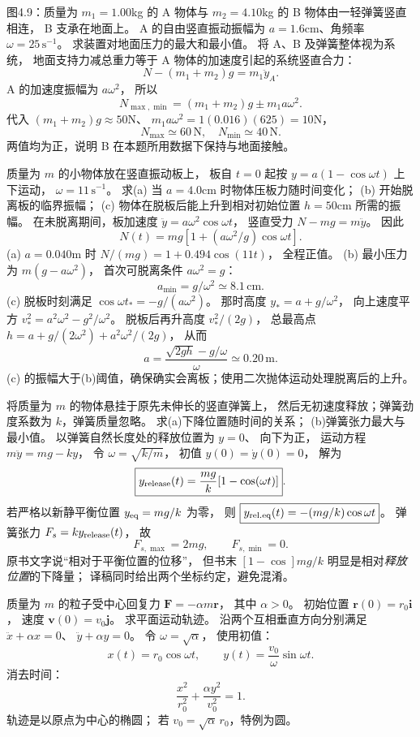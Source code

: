 图4.9：质量为 $m_1=1.00$kg 的 A 物体与
$m_2=4.10$kg 的 B 物体由一轻弹簧竖直相连，
B 支承在地面上。
A 的自由竖直振动振幅为
$a=1.6$cm、角频率
$\omega=25\,\mathrm{s^{-1}}$。
求装置对地面压力的最大和最小值。
\exsolution
将 A、B 及弹簧整体视为系统，
地面支持力减总重力等于 A 物体的加速度引起的系统竖直合力：
\[
N-(m_1+m_2)g=m_1\ddot y_A.
\]
A 的加速度振幅为 $a\omega^2$，
所以
\[
\boxed{N_{\max,\min}=
(m_1+m_2)g\pm m_1a\omega^2}.
\]
代入
$(m_1+m_2)g\approx50$N、
$m_1a\omega^2=1(0.016)(625)=10$N，
\[
\boxed{N_{\max}\simeq60\,\mathrm N,\quad
N_{\min}\simeq40\,\mathrm N}.
\]
\excheck 两值均为正，说明 B 在本题所用数据下保持与地面接触。

质量为 $m$ 的小物体放在竖直振动板上，
板自 $t=0$ 起按
$y=a(1-\cos\omega t)$ 上下运动，
$\omega=11\,\mathrm{s^{-1}}$。
求(a) 当 $a=4.0$cm 时物体压板力随时间变化；
(b) 开始脱离板的临界振幅；
(c) 物体在脱板后能上升到相对初始位置
$h=50$cm 所需的振幅。
\exsolution
在未脱离期间，板加速度
$\ddot y=a\omega^2\cos\omega t$，
竖直受力
$N-mg=m\ddot y$。
因此
\[
\boxed{N(t)=mg[1+(a\omega^2/g)\cos\omega t]}.
\]
(a) $a=0.040$m 时
$N/(mg)=1+0.494\cos(11t)$，
全程正值。
(b) 最小压力为 $m(g-a\omega^2)$，
首次可脱离条件 $a\omega^2=g$：
\[
\boxed{a_{\min}=g/\omega^2
\simeq8.1\,\mathrm{cm}}.
\]
(c) 脱板时刻满足
$\cos\omega t_*=-g/(a\omega^2)$。
那时高度
$y_*=a+g/\omega^2$，
向上速度平方
$v_*^2=a^2\omega^2-g^2/\omega^2$。
脱板后再升高度
$v_*^2/(2g)$，
总最高点
$h=a+g/(2\omega^2)+a^2\omega^2/(2g)$，
从而
\[
\boxed{a=\frac{\sqrt{2gh}-g/\omega}{\omega}
\simeq0.20\,\mathrm m}.
\]
\excheck (c) 的振幅大于(b)阈值，确保确实会离板；使用二次抛体运动处理脱离后的上升。

将质量为 $m$ 的物体悬挂于原先未伸长的竖直弹簧上，
然后无初速度释放；弹簧劲度系数为 $k$，弹簧质量忽略。
求(a)下降位置随时间的关系；
(b)弹簧张力最大与最小值。
\exsolution
以弹簧自然长度处的释放位置为 $y=0$、
向下为正，
运动方程
$m\ddot y=mg-ky$，
令 $\omega=\sqrt{k/m}$，
初值 $y(0)=\dot y(0)=0$，
解为
\[
\boxed{y_{\rm release}(t)=\frac{mg}{k}
[1-\cos(\omega t)]}.
\]
若严格以新静平衡位置 $y_{\rm eq}=mg/k$ 为零，
则
$\boxed{y_{\rm rel.eq}(t)=-(mg/k)\cos\omega t}$。
弹簧张力 $F_s=ky_{\rm release}(t)$，
故
\[
\boxed{F_{s,\max}=2mg,\qquad
F_{s,\min}=0}.
\]
\excheck 原书文字说“相对于平衡位置的位移”，
但书末 $[1-\cos]mg/k$ 明显是相对\emph{释放位置}的下降量；
译稿同时给出两个坐标约定，避免混淆。

质量为 $m$ 的粒子受中心回复力
$\bm F=-\alpha m\bm r$，
其中 $\alpha>0$。
初始位置 $\bm r(0)=r_0\bm i$，
速度 $\bm v(0)=v_0\bm j$。
求平面运动轨迹。
\exsolution
沿两个互相垂直方向分别满足
$\ddot x+\alpha x=0$、
$\ddot y+\alpha y=0$。
令 $\omega=\sqrt\alpha$，
使用初值：
\[
x(t)=r_0\cos\omega t,\qquad
y(t)=\frac{v_0}{\omega}\sin\omega t.
\]
消去时间：
\[
\boxed{\frac{x^2}{r_0^2}+
\frac{\alpha y^2}{v_0^2}=1}.
\]
\excheck 轨迹是以原点为中心的椭圆；
若 $v_0=\sqrt\alpha\,r_0$，特例为圆。

